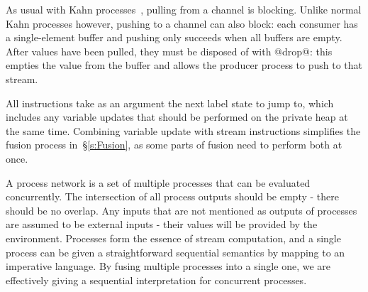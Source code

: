 As usual with Kahn processes~\cite{kahn1976coroutines}, pulling from a channel is blocking.
Unlike normal Kahn processes however, pushing to a channel can also block: each consumer has a single-element buffer and pushing only succeeds when all buffers are empty.
After values have been pulled, they must be disposed of with @drop@: this empties the value from the buffer and allows the producer process to push to that stream.

All instructions take as an argument the next label state to jump to, which includes any variable updates that should be performed on the private heap at the same time.
Combining variable update with stream instructions simplifies the fusion process in~\S\ref{s:Fusion}, as some parts of fusion need to perform both at once.


A process network is a set of multiple processes that can be evaluated concurrently.
The intersection of all process outputs should be empty - there should be no overlap.
Any inputs that are not mentioned as outputs of processes are assumed to be external inputs - their values will be provided by the environment.
Processes form the essence of stream computation, and a single process can be given a straightforward sequential semantics by mapping to an imperative language.
By fusing multiple processes into a single one, we are effectively giving a sequential interpretation for concurrent processes.


